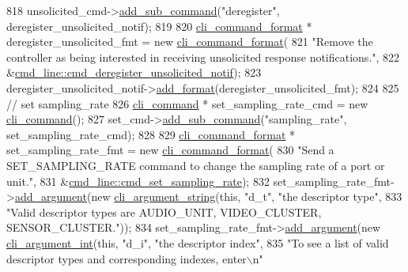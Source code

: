 \begin{DoxyCode}
818     unsolicited\_cmd->\hyperlink{classcli__command_aa73a67e8ebb6facd4b40ced66279b226}{add\_sub\_command}(\textcolor{stringliteral}{"deregister"}, deregister\_unsolicited\_notif);
819 
820     \hyperlink{classcli__command__format}{cli\_command\_format} * deregister\_unsolicited\_fmt = \textcolor{keyword}{new} 
      \hyperlink{classcli__command__format}{cli\_command\_format}(
821         \textcolor{stringliteral}{"Remove the controller as being interested in receiving unsolicited response notifications."},
822         &\hyperlink{classcmd__line_a6abd51584255e825872e14094c48f9ef}{cmd\_line::cmd\_deregister\_unsolicited\_notif});
823     deregister\_unsolicited\_notif->\hyperlink{classcli__command_aa9ec38e761644d946f8db2b920e39921}{add\_format}(deregister\_unsolicited\_fmt);
824 
825     \textcolor{comment}{// set sampling\_rate}
826     \hyperlink{classcli__command}{cli\_command} * set\_sampling\_rate\_cmd = \textcolor{keyword}{new} \hyperlink{classcli__command}{cli\_command}();
827     set\_cmd->\hyperlink{classcli__command_aa73a67e8ebb6facd4b40ced66279b226}{add\_sub\_command}(\textcolor{stringliteral}{"sampling\_rate"}, set\_sampling\_rate\_cmd);
828 
829     \hyperlink{classcli__command__format}{cli\_command\_format} * set\_sampling\_rate\_fmt = \textcolor{keyword}{new} 
      \hyperlink{classcli__command__format}{cli\_command\_format}(
830         \textcolor{stringliteral}{"Send a SET\_SAMPLING\_RATE command to change the sampling rate of a port or unit."},
831         &\hyperlink{classcmd__line_af21cc234e95dba0e6c646e1ca67b57ad}{cmd\_line::cmd\_set\_sampling\_rate});
832     set\_sampling\_rate\_fmt->\hyperlink{classcli__command__format_ac3fc6d13a227c195d5ee6f7b78eba9cd}{add\_argument}(\textcolor{keyword}{new} \hyperlink{classcli__argument__string}{cli\_argument\_string}(\textcolor{keyword}{this}, \textcolor{stringliteral}{"d\_t"},
       \textcolor{stringliteral}{"the descriptor type"},
833                                                                 \textcolor{stringliteral}{"Valid descriptor types are AUDIO\_UNIT,
       VIDEO\_CLUSTER, SENSOR\_CLUSTER."}));
834     set\_sampling\_rate\_fmt->\hyperlink{classcli__command__format_ac3fc6d13a227c195d5ee6f7b78eba9cd}{add\_argument}(\textcolor{keyword}{new} \hyperlink{classcli__argument__int}{cli\_argument\_int}(\textcolor{keyword}{this}, \textcolor{stringliteral}{"d\_i"}, \textcolor{stringliteral}{"the
       descriptor index"},
835                                                              \textcolor{stringliteral}{"To see a list of valid descriptor types and
       corresponding indexes, enter\(\backslash\)n"}

\end{DoxyCode}
